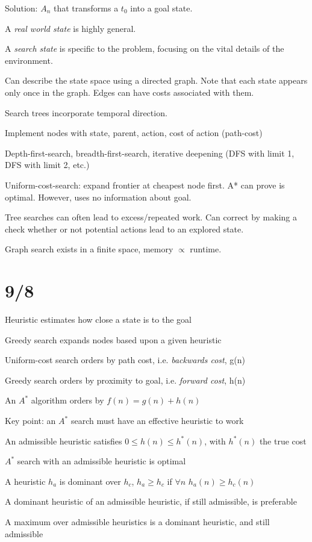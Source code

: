 \documentclass[12pt]{article}
\begin{document}
Solution: ${A_n}$ that transforms a $t_0$ into a goal state.

A \textit{real world state} is highly general.

A \textit{search state} is specific to the problem, focusing on the vital details of the environment.

Can describe the state space using a directed graph.  Note that each state appears only once in the graph.  Edges can have costs associated with them.

Search trees incorporate temporal direction.

Implement nodes with state, parent, action, cost of action (path-cost)

Depth-first-search, breadth-first-search, iterative deepening (DFS with limit 1, DFS with limit 2, etc.)

Uniform-cost-search: expand frontier at cheapest node first. A* can prove is optimal. However, uses no information about goal.

Tree searches can often lead to excess/repeated work.  Can correct by making a check whether or not potential actions lead to an explored state.

Graph search exists in a finite space, memory $\propto$ runtime.

\section{9/8}

Heuristic estimates how close a state is to the goal

Greedy search expands nodes based upon a given heuristic

Uniform-cost search orders by path cost, i.e. \textit{backwards cost}, g(n)

Greedy search orders by proximity to goal, i.e. \textit{forward cost}, h(n)

An $A^*$ algorithm orders by $f(n) = g(n) + h(n)$

Key point: an $A^*$ search must have an effective heuristic to work

An admissible heuristic satisfies $0 \leq h(n) \leq h^*(n)$, with $h^*(n)$ the true cost

$A^*$ search with an admissible heuristic is optimal

A heuristic $h_a$ is dominant over $h_c$, $h_a \geq h_c$ if $\forall n$ $h_a(n) \geq h_c(n)$

A dominant heuristic of an admissible heuristic, if still admissible, is preferable

A maximum over admissible heuristics is a dominant heuristic, and still admissible
\end{document}

